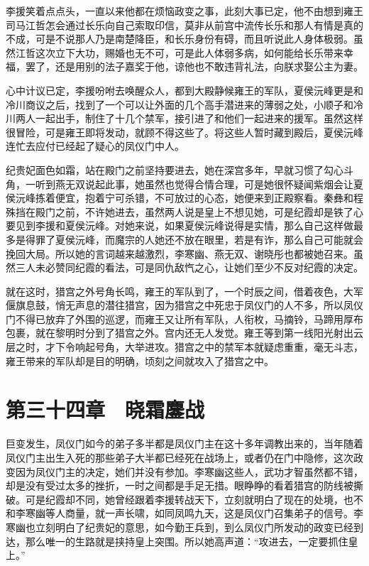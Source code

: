 李援笑着点点头，一直以来他都在烦恼政变之事，此刻大事已定，他不由想到雍王司马江哲怎会通过长乐向自己索取印信，莫非从前宫中流传长乐和那人有情是真的不成，可是不说那人乃是南楚降臣，和长乐身份有碍，而且听说此人身体极弱。虽然江哲这次立下大功，赐婚也无不可，可是此人体弱多病，如何能给长乐带来幸福，罢了，还是用别的法子嘉奖于他，谅他也不敢违背礼法，向朕求娶公主为妻。

心中计议已定，李援吩咐去唤醒众人，都到大殿静候雍王的军队，夏侯沅峰更是和冷川商议之后，找到了一个可以让外面的几个高手潜进来的薄弱之处，小顺子和冷川两人一起出手，制住了十几个禁军，接引进了和他们一起进来的援军。虽然这样很冒险，可是雍王即将发动，就顾不得这些了。将这些人暂时藏到殿后，夏侯沅峰连忙去应付已经起了疑心的凤仪门中人。

纪贵妃面色如霜，站在殿门之前坚持要进去，她在深宫多年，早就习惯了勾心斗角，一听到燕无双说起此事，她虽然也觉得合情合理，可是她很怀疑闻紫烟会让夏侯沅峰拣着便宜，抱着宁可杀错，不可放过的心态，她便来到正殿察看。秦彝和程殊挡在殿门之前，不许她进去，虽然两人说是皇上不想见她，可是纪霞却是铁了心要见到李援和夏侯沅峰。对她来说，如果夏侯沅峰说得是实情，那么自己这样做最多是得罪了夏侯沅峰，而魔宗的人她还不放在眼里，若是有诈，那么自己可能就会挽回大局。所以她的言词越来越激烈，李寒幽、燕无双、谢晓彤也都被她召来。虽然三人未必赞同纪霞的看法，可是同仇敌忾之心，让她们至少不反对纪霞的决定。

就在这时，猎宫之外号角长鸣，雍王的军队到了，一个时辰之间，借着夜色，大军偃旗息鼓，悄无声息的潜往猎宫，因为猎宫之中死忠于凤仪门的人不多，所以凤仪门不得已放弃了外围的巡逻，而雍王又让所有军队，人衔枚，马摘铃，马蹄用厚布包裹，就在黎明时分到了猎宫之外。宫内还无人发觉。雍王等到第一线阳光射出云层之时，才下令响起号角，大举进攻。猎宫之中的禁军本就疑虑重重，毫无斗志，雍王带来的军队却是目的明确，顷刻之间就攻入了猎宫之中。

\chapter{第三十四章　晓霜鏖战}

巨变发生，凤仪门如今的弟子多半都是凤仪门主在这十多年调教出来的，当年随着凤仪门主出生入死的那些弟子大半都已经死在战场上，或者仍在门中隐修，这次政变因为凤仪门主的决定，她们并没有参加。李寒幽这些人，武功才智虽然都不错，却是没有受过太多的挫折，一时之间都是手足无措。眼睁睁的看着猎宫的防线被撕破。可是纪霞却不同，她曾经跟着李援转战天下，立刻就明白了现在的处境，也不和李寒幽等人商量，就一声长啸，如同凤鸣九天，这是凤仪门召集弟子的信号。李寒幽也立刻明白了纪贵妃的意思，如今勤王兵到，到么凤仪门所发动的政变已经到达，那么唯一的生路就是挟持皇上突围。所以她高声道：“攻进去，一定要抓住皇上。”

